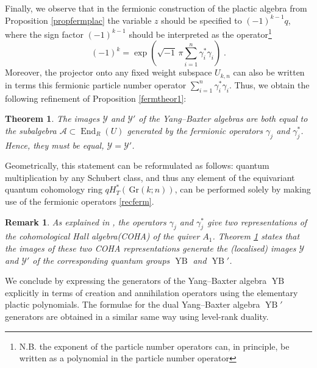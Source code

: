 \documentclass[12pt]{amsart}
\newcommand{\Gr}{\,\mathrm{Gr}}
\newcommand{\End}{\operatorname{End}}
\newcommand{\mc}[1]{\mathcal{#1}}
\newcommand{\ring}{R}
\newtheorem{remark}{Remark}[section]
\newtheorem{thm}{Theorem}[section]
\numberwithin{equation}{section}
\numberwithin{figure}{section}
\newcommand{\YB}{\operatorname{YB}}
\begin{document}
Finally, we observe that in the fermionic construction of the plactic algebra from Proposition \ref{propfermplac} the variable $z$ should be specified to $(-1)^{k - 1} q$, where the sign factor $(-1)^{k - 1}$ should be interpreted as the operator\footnote{N.B. the exponent of the particle number operators can, in principle, be written as a polynomial in the particle number operator} 
\[
(-1)^k = \exp\left(\sqrt{-1}\,\pi\sum\limits_{i = 1}^n \gamma^*_i \gamma_i\right)\;.
\]
Moreover, the projector onto any fixed weight subspace $U_{k,n}$ can also be written in terms this fermionic particle number operator $\sum_{i=1}^n\gamma_i^*\gamma_i$. 
Thus, we obtain the following refinement of Proposition \ref{fermtheor1}:
\begin{thm} \label{fermtheor2}
    The images $\mathcal{Y}$ and $\mathcal{Y}'$ of the Yang--Baxter algebras are both equal to the subalgebra $\mc{A}\subset\End_\ring(U)$ generated by the fermionic operators $\gamma_j$ and $\gamma^*_j$. Hence, they must be equal, $\mathcal{Y} = \mathcal{Y}'$.
\end{thm}
\noindent Geometrically, this statement can be reformulated as follows: quantum multiplication by any Schubert class, and thus any element of the equivariant quantum cohomology ring $qH^*_T(\Gr(k;n))$, can be performed solely by making use of the fermionic operators \eqref{recferm}. 
\begin{remark}\rm
    As explained in \cite[Proposition 7.2]{GKS20}, the operators $\gamma_j$ and $\gamma^*_j$ give two representations of the cohomological Hall algebra(COHA) of the quiver $A_1$. Theorem \ref{fermtheor2} states that the images of these two COHA representations generate the (localised) images $\mathcal{Y}$ and $\mathcal{Y}'$ of the corresponding quantum groups $\YB$ and $\YB'$.
\end{remark}
We conclude by expressing the generators of the Yang--Baxter algebra $\YB$ explicitly in terms of creation and annihilation operators using the elementary plactic polynomials. The formulae for the dual Yang--Baxter algebra $\YB'$ generators are obtained in a similar same way using level-rank duality.
\end{document}
